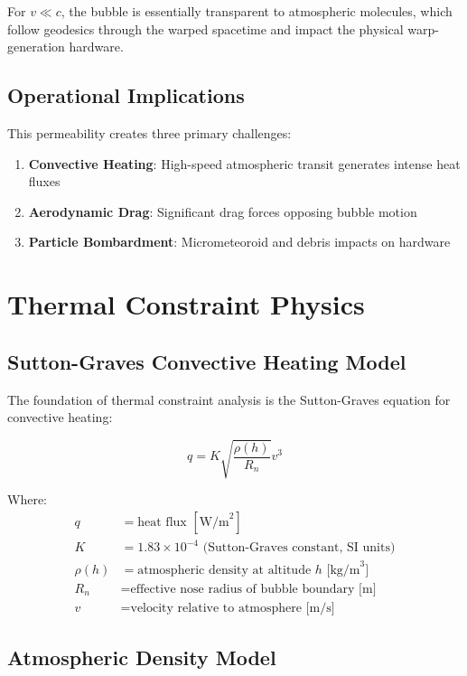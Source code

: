 \documentclass[12pt,a4paper]{article}
\begin{document}
For $v \ll c$, the bubble is essentially transparent to atmospheric molecules, which follow geodesics through the warped spacetime and impact the physical warp-generation hardware.

\subsection{Operational Implications}

This permeability creates three primary challenges:
\begin{enumerate}
\item \textbf{Convective Heating}: High-speed atmospheric transit generates intense heat fluxes
\item \textbf{Aerodynamic Drag}: Significant drag forces opposing bubble motion  
\item \textbf{Particle Bombardment}: Micrometeoroid and debris impacts on hardware
\end{enumerate}

\section{Thermal Constraint Physics}

\subsection{Sutton-Graves Convective Heating Model}

The foundation of thermal constraint analysis is the Sutton-Graves equation for convective heating:

\begin{equation}
q = K \sqrt{\frac{\rho(h)}{R_n}} v^3
\end{equation}

Where:
\begin{align}
q &= \text{heat flux } [\text{W/m}^2] \\
K &= 1.83 \times 10^{-4} \text{ (Sutton-Graves constant, SI units)} \\
\rho(h) &= \text{atmospheric density at altitude } h \text{ [kg/m}^3\text{]} \\
R_n &= \text{effective nose radius of bubble boundary [m]} \\
v &= \text{velocity relative to atmosphere [m/s]}
\end{align}

\subsection{Atmospheric Density Model}
\end{document}
